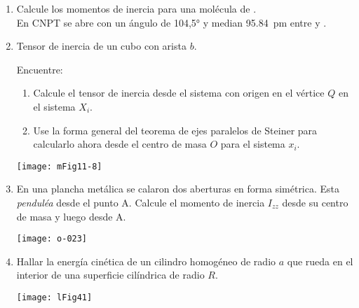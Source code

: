 \documentclass[11pt,spanish,a4paper]{article}
\begin{document}
\begin{enumerate}
\item Calcule los momentos de inercia para una molécula de .\\
En CNPT se abre con un ángulo de \ang{104,5;;} y median \SI{95.84}{\pico\metre} entre  y .




\item 
    \begin{minipage}[t][3.7cm]{0.6\textwidth}
		Tensor de inercia de un cubo con arista \(b\).
	
		Encuentre: 
		\begin{enumerate}
			\item Calcule el tensor de inercia desde el sistema con origen en el vértice \(Q\) en el sistema \(X_i\).
			\item Use la forma general del teorema de ejes paralelos de Steiner para calcularlo ahora desde el centro de masa \(O\) para el sistema \(x_i\).
		\end{enumerate}
    \end{minipage}
    \begin{minipage}[c][1.2cm][t]{0.35\textwidth}
        \texttt{[image: mFig11-8]}
    \end{minipage}


\item 
\begin{minipage}[t][3cm]{0.5\textwidth}
En una plancha metálica se calaron dos aberturas en forma simétrica.
Esta \emph{penduléa} desde el punto A.
Calcule el momento de inercia \(I_{zz}\) desde su centro de masa y luego desde A.
\end{minipage}
\begin{minipage}[c][4cm][t]{0.45\textwidth}
	\texttt{[image: o-023]}
\end{minipage}



\item 
\begin{minipage}[t][1.5cm]{0.65\textwidth}
	Hallar la energía cinética de un cilindro homogéneo de radio \(a\) que rueda en el interior de una superficie cilíndrica de radio \(R\).
\end{minipage}
\begin{minipage}[c][1.5cm][t]{0.3\textwidth}
\texttt{[image: lFig41]}
\end{minipage}




\end{enumerate}
\end{document}
